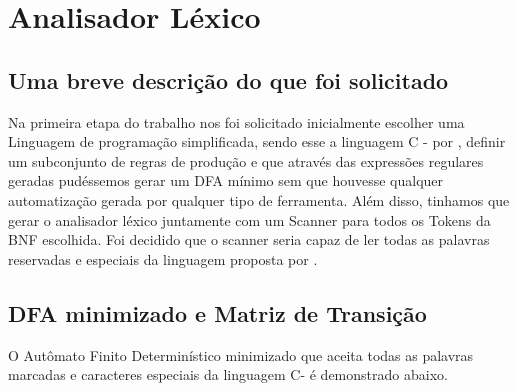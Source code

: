 \documentclass[12pt]{article}
\begin{document}
\newpage
\section{Analisador Léxico} 

\subsection{Uma breve descrição do que foi solicitado}

Na primeira etapa do trabalho nos foi solicitado inicialmente escolher uma Linguagem de programação simplificada, sendo esse a linguagem C - por \cite{LOUDEN}, definir um subconjunto de regras de produção e que através das expressões regulares geradas pudéssemos gerar um DFA mínimo sem que houvesse qualquer automatização gerada por qualquer tipo de ferramenta. Além disso, tinhamos que gerar o analisador léxico juntamente com um Scanner para todos os Tokens da BNF escolhida.  
Foi decidido que o scanner seria capaz de ler todas as palavras reservadas e especiais da linguagem proposta por \cite{LOUDEN}.

\subsection{DFA minimizado e Matriz de Transição}

O Autômato Finito Determinístico minimizado que aceita todas as palavras marcadas e caracteres especiais da linguagem C- é demonstrado abaixo.
\end{document}
